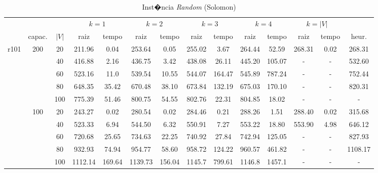 \documentclass[12pt]{article}
\begin{document}
\vspace{1cm}

\begin{table}[!htb]
\centering
\footnotesize
\begin{tabular}{|c|c|c|c|c|c|c|c|c|c|c|c|c|c|}
\cline{4-13}
\multicolumn{3}{c}{} & \multicolumn{2}{|c}{$k=1$} & \multicolumn{2}{|c|}{$k=2$} & \multicolumn{2}{c|}{$k=3$} & \multicolumn{2}{c|}{$k=4$} & \multicolumn{2}{|c|}{$k=|V|$} & \multicolumn{1}{c}{}\\
\cline{2-14}
\multicolumn{1}{c}{} & \multicolumn{1}{|c}{capac.} & \multicolumn{1}{|c|}{$|V|$} & \multicolumn{1}{|c|}{raiz} & \multicolumn{1}{|c|}{tempo} & \multicolumn{1}{|c|}{raiz} & \multicolumn{1}{|c|}{tempo} & \multicolumn{1}{|c|}{raiz} & \multicolumn{1}{|c|}{tempo} & \multicolumn{1}{|c|}{raiz} & \multicolumn{1}{|c|}{tempo} & \multicolumn{1}{|c|}{raiz} & \multicolumn{1}{|c|}{tempo} & \multicolumn{1}{|c|}{heur.} \\
\hline
\multirow{10}{*}{r101}
& \multirow{5}{*}{200} & 20 & 211.96 & 0.04 & 253.64 & 0.05 & 255.02 & 3.67 & 264.44 & 52.59 & 268.31 & 0.02 & 268.31\\
\cline{3-14}
& \multirow{5}{*}{} & 40 & 416.88 & 2.16 & 436.75 & 3.42 & 438.08 & 26.11 & 445.20 & 105.07 & - & - & 532.60\\
\cline{3-14}
& \multirow{5}{*}{} & 60 & 523.16 & 11.0 & 539.54 & 10.55 & 544.07 & 164.47 & 545.89 & 787.24 & - & - & 752.44\\
\cline{3-14}
& \multirow{5}{*}{} & 80 & 648.35 & 35.42 & 670.48 & 38.10 & 673.84 & 132.19 & 675.03 & 170.10 & - & - & 820.31 \\
\cline{3-14}
& \multirow{5}{*}{} & 100 & 775.39 & 51.46 & 800.75 & 54.55 & 802.76 & 22.31 & 804.85 & 18.02 & - & - & - \\
\cline{2-14}
& \multirow{5}{*}{100} & 20 & 243.27 & 0.02 & 280.54 & 0.02 & 284.46 & 0.21 & 288.26 & 1.51 & 288.40 & 0.02 & 315.68\\
\cline{3-14}
& \multirow{5}{*}{} & 40 & 523.33 & 6.94 & 544.50 & 6.32 & 550.91 & 7.27 & 553.22 & 18.80 & 553.90 & 4.98 & 646.12\\
\cline{3-14}
& \multirow{5}{*}{} & 60 & 720.68 & 25.65 & 734.63 & 22.25 & 740.92 & 27.84 & 742.94 & 125.05 & - & - & 827.93 \\ 
\cline{3-14}
& \multirow{5}{*}{} & 80 & 932.93 & 74.94 & 954.77 & 58.60 & 958.72 & 124.22 & 960.57 & 461.82 & - & - & 1108.17 \\ 
\cline{3-14}
& \multirow{5}{*}{} & 100 & 1112.14 & 169.64 & 1139.73 & 156.04 & 1145.7 & 799.61 & 1146.8 & 1457.1 & - & - & -\\ 
\hline
\end{tabular}
\caption{Inst�ncia \emph{Random} (Solomon)}
\label{tab:different-dynamic-approaches}
\end{table}
\end{document}
